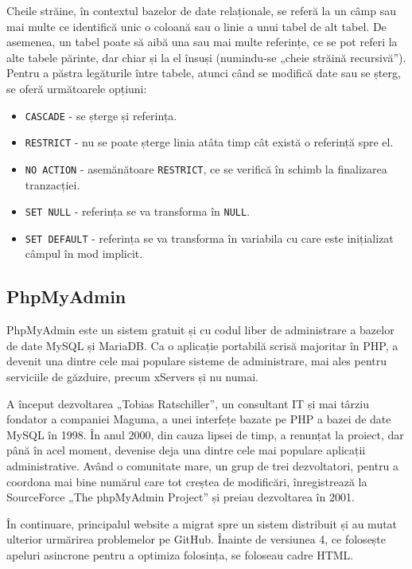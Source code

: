 	Cheile străine, în contextul bazelor de date relaționale, se referă la un câmp sau mai multe ce identifică unic o coloană sau o linie a unui tabel de alt tabel\cite{foreign_key}.
	De asemenea, un tabel poate să aibă una sau mai multe referințe, ce se pot referi la alte tabele părinte, dar chiar și la el însuși (numindu-se „cheie străină recursivă”).
	Pentru a păstra legăturile între tabele, atunci când se modifică date sau se șterg, se oferă următoarele opțiuni:
	\begin{itemize}
		\item \verb|CASCADE| - se șterge și referința.
		\item \verb|RESTRICT| - nu se poate șterge linia atâta timp cât există o referință spre el.
		\item \verb|NO ACTION| - asemănătoare \verb|RESTRICT|, ce se verifică în schimb la finalizarea tranzacției.
		\item \verb|SET NULL| - referința se va transforma în \verb|NULL|.
		\item \verb|SET DEFAULT| - referința se va transforma în variabila cu care este inițializat câmpul în mod implicit.
	\end{itemize}

	\subsection{PhpMyAdmin}

	PhpMyAdmin este un sistem gratuit și cu codul liber de administrare a bazelor de date MySQL și MariaDB.
	Ca o aplicație portabilă scrisă majoritar în PHP, a devenit una dintre cele mai populare sisteme de administrare, mai ales pentru serviciile de găzduire, precum xServers și nu numai.

	A început dezvoltarea „Tobias Ratschiller”, un consultant IT și mai târziu fondator a companiei Maguma, a unei interfețe bazate pe PHP a bazei de date MySQL în 1998.
	În anul 2000, din cauza lipsei de timp, a renunțat la proiect, dar până în acel moment, devenise deja una dintre cele mai populare aplicații administrative.
	Având o comunitate mare, un grup de trei dezvoltatori, pentru a coordona mai bine numărul care tot creștea de modificări, înregistrează la SourceForce „The phpMyAdmin Project” și preiau dezvoltarea în 2001. \cite{phpmyadmin}

	În continuare, principalul website a migrat spre un sistem distribuit și au mutat ulterior urmărirea problemelor pe GitHub.
	Înainte de versiunea 4, ce folosește apeluri asincrone pentru a optimiza folosința, se foloseau cadre HTML.

